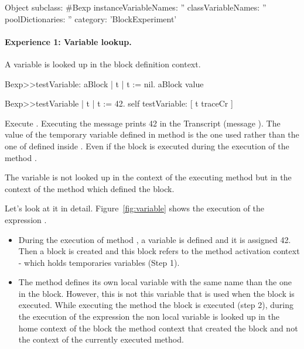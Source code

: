 \documentclass[a4paper,10pt,twoside]{book}
\begin{document}
\begin{code}{}
Object subclass: #Bexp
	instanceVariableNames: ''
	classVariableNames: ''
	poolDictionaries: ''
	category: 'BlockExperiment'
\end{code}

\paragraph{Experience 1: Variable lookup.} A variable is looked up in the block definition context.



\begin{code}{}
Bexp>>testVariable: aBlock
	| t |
	t := nil.
	aBlock value

Bexp>>testVariable
	| t |
	t := 42.
	self testVariable: [ t traceCr ]
\end{code}

Execute . Executing the  message  prints 42 in the Transcript (message ). The value of the temporary variable  defined in method  is the one used rather than the one of  defined inside . Even if the block is executed during the execution of the method .

The variable  is not looked up in the context of the executing method  but in the context of the method  which defined the block.

Let's look at it in detail. Figure~\ref{fig:variable} shows the execution of the expression . 

\begin{itemize}
\item During the execution of method , a variable  is defined and it is assigned 42. Then a block is created and this block refers to the method activation context - which holds temporaries variables (Step 1). 

\item The method  defines its own local variable  with the same name than the one in the block. However, this is not this variable that is used when the block is executed. While executing the method  the block is executed (step 2), during the execution of the expression  the non local variable  is looked up in the home context of the block \ie the method context that created the block and not the context of the currently executed method.
\end{itemize}
\end{document}
